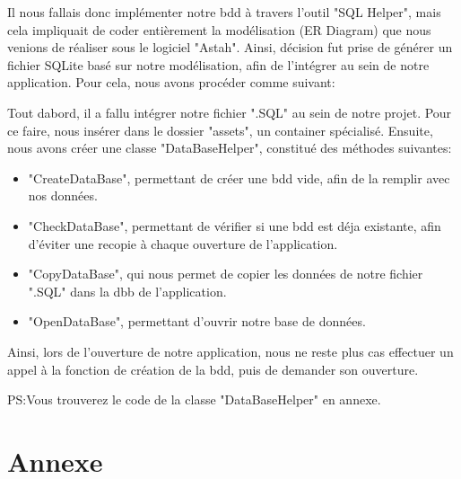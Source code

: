 \documentclass[french,a4paper,12pt]{report}
\begin{document}
Il nous fallais donc implémenter notre bdd à travers l'outil "SQL Helper", mais
cela impliquait de coder entièrement la modélisation (ER Diagram) que nous
venions de réaliser sous le logiciel "Astah".
Ainsi, décision fut prise de générer un fichier SQLite basé sur notre modélisation,
afin de l'intégrer au sein de notre application. Pour cela, nous avons procéder
comme suivant:

Tout dabord, il a fallu intégrer notre fichier ".SQL" au sein de notre projet.
Pour ce faire, nous insérer dans le dossier "assets", un container spécialisé.
Ensuite, nous avons créer une classe "DataBaseHelper", constitué des méthodes
suivantes:
\begin{itemize}
  \item "CreateDataBase", permettant de créer une bdd vide, afin de la remplir avec
  nos données.
  \item "CheckDataBase", permettant de vérifier si une bdd est déja existante, afin
  d'éviter une recopie à chaque ouverture de l'application.
  \item "CopyDataBase", qui nous permet de copier les données de notre fichier ".SQL"
  dans la dbb de l'application.
  \item "OpenDataBase", permettant d'ouvrir notre base de données.
\end{itemize}
Ainsi, lors de l'ouverture de notre application, nous ne reste plus cas effectuer
un appel à la fonction de création de la bdd, puis de demander son ouverture. \newline

PS:Vous trouverez le code de la classe "DataBaseHelper" en annexe.

\chapter{Annexe}
\end{document}
